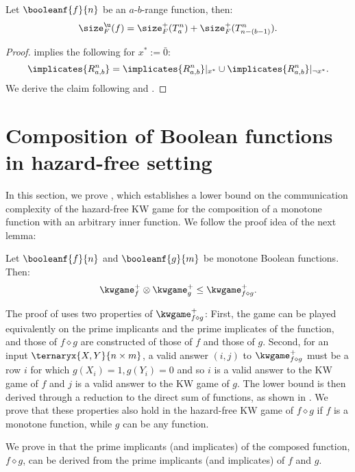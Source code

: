 \documentclass[acmsmall, nonacm, authorversion]{acmart}
\begin{document}
\begin{proposition}\label{prop:tight-lower-bound-range}
Let $\booleanf{f}{n}$ be an $a$-$b$-range function, then:
\[
\size_F^\u(f)=\size_F^+(T_a^n)+\size_F^+(T_{n-(b-1)}^n).
\]
\end{proposition}
\begin{proof}
  implies the following for $x^*:=\bar{0}$:
\[
\implicates{R_{a,b}^n}=\implicates{R_{a,b}^n}|_{x^*} \cup \implicates{R_{a,b}^n}|_{\neg x^*}.
\]
We derive the claim following  and .
\end{proof}

\section{Composition of Boolean functions in hazard-free setting}\label{sec:composition-hazard-free}
In this section, we prove , which establishes a lower bound on the communication complexity of the hazard-free KW game for the composition of a monotone function with an arbitrary inner function. We follow the proof idea of the next lemma:
\begin{lemma}\label{lem:composition-of-monotone-relations}
Let $\booleanf{f}{n}$ and $\booleanf{g}{m}$ be monotone Boolean functions. Then:
\[
\kwgame_{f}^+\otimes\kwgame_{g}^+\leq \kwgame^+_{f\diamond g}.
\]
\end{lemma}
The proof of  uses two properties of $\kwgame^+_{f\diamond g}$: First, the game can be played equivalently on the prime implicants and the prime implicates of the function, and those of $f\diamond g$ are constructed of those of $f$ and those of $g$. Second, for an input $\ternaryx{X,Y}{n\times m}$, a valid answer $(i,j)$ to $\kwgame^+_{f\diamond g}$ must be a row $i$ for which $g(X_i)=1, g(Y_i)=0$ and so $i$ is a valid answer to the KW game of $f$ and $j$ is a valid answer to the KW game of $g$.
The lower bound is then derived through a reduction to the direct sum of functions, as shown in \cite[Corollary 5]{KRW95}. We prove that these properties also hold in the hazard-free KW game of $f\diamond g$ if $f$ is a monotone function, while $g$ can be any function. 

We prove in  that the prime implicants (and implicates) of the composed function, $f\diamond g$, can be derived from the prime implicants (and implicates) of $f$ and $g$. 
\end{document}
